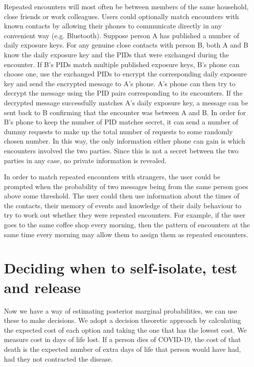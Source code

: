 \documentclass{article}
\begin{document}
Repeated encounters will most often be between members of the same household, close friends or work colleagues. Users could optionally match encounters with known contacts by allowing their phones to communicate directly in any convenient way (e.g. Bluetooth). Suppose person A has published a number of daily exposure keys. For any genuine close contacts with person B, both A and B know the daily exposure key and the PIDs that were exchanged during the encounter. If B's PIDs match multiple published exposure keys, B's phone can choose one, use the exchanged PIDs to encrypt the corresponding daily exposure key and send the encrypted message to A's phone. A's phone can then try to decrypt the message using the PID pairs corresponding to its encounters. If the decrypted message successfully matches A's daily exposure key, a message can be sent back to B confirming that the encounter was between A and B. In order for B's phone to keep the number of PID matches secret, it can send a number of dummy requests to make up the total number of requests to some randomly chosen number. In this way, the only information either phone can gain is which encounters involved the two parties. Since this is not a secret between the two parties in any case, no private information is revealed.

In order to match repeated encounters with strangers, the user could be prompted when the probability of two messages being from the same person goes above some threshold. The user could then use information about the times of the contacts, their memory of events and knowledge of their daily behaviour to try to work out whether they were repeated encounters. For example, if the user goes to the same coffee shop every morning, then the pattern of encounters at the same time every morning may allow them to assign them as repeated encounters.


\section{Deciding when to self-isolate, test and release}
Now we have a way of estimating posterior marginal probabilities, we can use these to make decisions. We adopt a decision theoretic approach by calculating the expected cost of each option and taking the one that has the lowest cost. We measure cost in days of life lost. If a person dies of COVID-19, the cost of that death is the expected number of extra days of life that person would have had, had they not contracted the disease.
\end{document}
